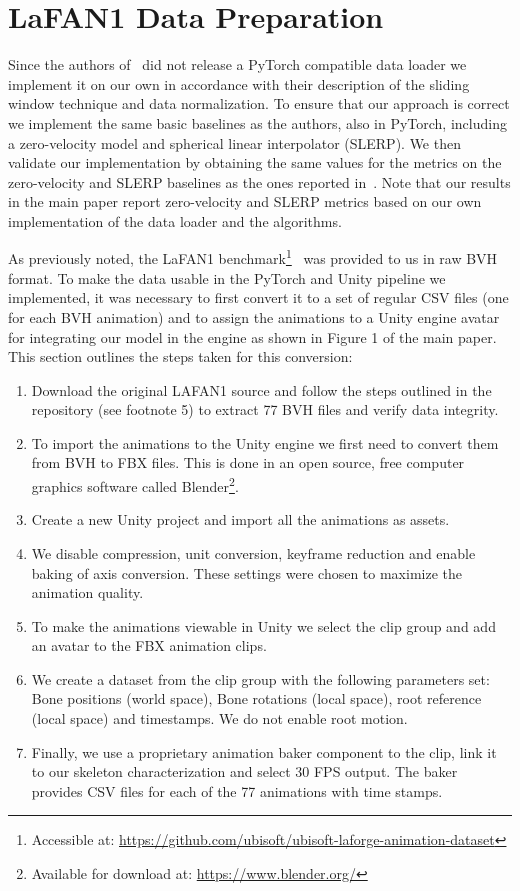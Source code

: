 \documentclass[letterpaper]{article} \usepackage[]{aaai23}  \usepackage{times}  \usepackage{helvet}  \usepackage{courier}  \usepackage[hyphens]{url}  \usepackage{graphicx} \urlstyle{rm} \def\UrlFont{\rm}  \usepackage{natbib}  \usepackage{caption} \frenchspacing  \setlength{\pdfpagewidth}{8.5in} \setlength{\pdfpageheight}{11in}
\begin{document}
\section{LaFAN1 Data Preparation} \label{sec:dataset_details}

Since the authors of~\cite{harvey2020robust} did not release a PyTorch compatible data loader we implement it on our own in accordance with their description of the sliding window technique and data normalization. To ensure that our approach is correct we implement the same basic baselines as the authors, also in PyTorch, including a zero-velocity model and spherical linear interpolator (SLERP). We then validate our implementation by obtaining the same values for the metrics on the zero-velocity and SLERP baselines as the ones reported in~\cite{harvey2020robust}. Note that our results in the main paper report zero-velocity and SLERP metrics based on our own implementation of the data loader and the algorithms.

As previously noted, the LaFAN1 benchmark\footnote{Accessible at: \url{https://github.com/ubisoft/ubisoft-laforge-animation-dataset}}~\cite{harvey2020robust} was provided to us in raw BVH format.
To make the data usable in the PyTorch and Unity pipeline we implemented, it was necessary to first convert it to a set of regular CSV files (one for each BVH animation) and to assign the animations to a Unity engine avatar for integrating our model in the engine as shown in Figure 1 of the main paper.
This section outlines the steps taken for this conversion:
\begin{enumerate}
    \item Download the original LAFAN1 source and follow the steps outlined in the repository (see footnote 5) to extract 77 BVH files and verify data integrity.
    \item To import the animations to the Unity engine we first need to convert them from BVH to FBX files. This is done in an open source, free computer graphics software called Blender\footnote{Available for download at: \url{https://www.blender.org/}}.
    \item Create a new Unity project and import all the animations as assets.
    \item We disable compression, unit conversion, keyframe reduction and enable baking of axis conversion. 
    These settings were chosen to maximize the animation quality.
    \item To make the animations viewable in Unity we select the clip group and add an avatar to the FBX animation clips.
    \item We create a dataset from the clip group with the following parameters set: Bone positions (world space), Bone rotations (local space), root reference (local space) and timestamps. We do not enable root motion.
    \item Finally, we use a proprietary animation baker component to the clip, link it to our skeleton characterization and select 30 FPS output. The baker provides CSV files for each of the 77 animations with time stamps.
\end{enumerate}
\end{document}
